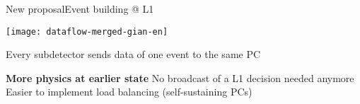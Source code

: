 \begin{frame}{New proposal}{Event building @ L1}
	\begin{center} 
		\texttt{[image: dataflow-merged-gian-en]}
	\end{center} 
	
	\begin{block}{Every subdetector sends data of one event to the same PC}
		\begin{itemize}
		  	\pro \textbf{More physics at earlier state}
		  	\pro No broadcast of a L1 decision needed anymore
		  	\pro Easier to implement load balancing (self-sustaining PCs)
		\end{itemize}
	\end{block}
\end{frame}